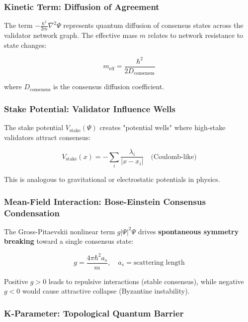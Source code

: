 \documentclass[11pt,a4paper]{article}
\begin{document}
\subsubsection{Kinetic Term: Diffusion of Agreement}

The term $-\frac{\hbar^2}{2m}\nabla^2\Psi$ represents quantum diffusion of consensus states across the validator network graph. The effective mass $m$ relates to network resistance to state changes:

\begin{equation}
m_{\text{eff}} = \frac{\hbar^2}{2D_{\text{consensus}}}
\end{equation}

where $D_{\text{consensus}}$ is the consensus diffusion coefficient.

\subsubsection{Stake Potential: Validator Influence Wells}

The stake potential $V_{\text{stake}}(\Psi)$ creates "potential wells" where high-stake validators attract consensus:

\begin{equation}
V_{\text{stake}}(x) = -\sum_i \frac{\lambda_i}{|x - x_i|} \quad \text{(Coulomb-like)}
\end{equation}

This is analogous to gravitational or electrostatic potentials in physics.

\subsubsection{Mean-Field Interaction: Bose-Einstein Consensus Condensation}

The Gross-Pitaevskii nonlinear term $g|\Psi|^2\Psi$ drives \textbf{spontaneous symmetry breaking} toward a single consensus state:

\begin{equation}
g = \frac{4\pi\hbar^2 a_s}{m}, \quad a_s = \text{scattering length}
\end{equation}

Positive $g > 0$ leads to repulsive interactions (stable consensus), while negative $g < 0$ would cause attractive collapse (Byzantine instability).

\subsubsection{K-Parameter: Topological Quantum Barrier}
\end{document}
